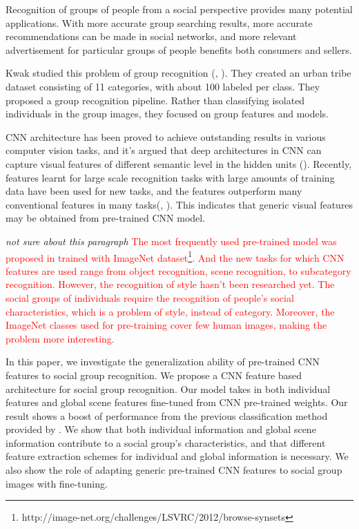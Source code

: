 \documentclass[10pt,twocolumn,letterpaper]{article}
\begin{document}
Recognition of groups of people from a social perspective provides many potential applications.  With more accurate group searching results, more accurate recommendations can be made in social networks, and more relevant advertisement for particular groups of people benefits both consumers and sellers.

Kwak \etal studied this problem of group recognition (\cite{urbantribe}, \cite{urbantribe2}). They created an urban tribe dataset consisting of 11 categories, with about 100 labeled per class.  They proposed a group recognition pipeline. Rather than classifying isolated individuals in the group images, they focused on group features and models.

CNN architecture has been proved to achieve outstanding results in various computer vision tasks, and it's argued that deep architectures in CNN can capture visual features of different semantic level in the hidden units (\cite{ImageNet13}). Recently, features learnt for large scale recognition tasks with large amounts of training data have been used for new tasks, and the features outperform many conventional features in many tasks(\cite{ImageNet13}, \cite{decaf}). This indicates that generic visual features may be obtained from pre-trained CNN model. 

\emph{not sure about this paragraph}
\textcolor{red} {The most frequently used pre-trained model was proposed in \cite{ImageNet} trained with ImageNet dataset\footnote{http://image-net.org/challenges/LSVRC/2012/browse-synsets}. And the new tasks for which CNN features are used range from object recognition, scene recognition, to subcategory recognition. However, the recognition of style hasn't been researched yet. The social groups of individuals require the recognition of people's social characteristics, which is a problem of style, instead of category. Moreover, the ImageNet classes used for pre-training cover few human images, making the problem more interesting.}




In this paper, we investigate the generalization ability of pre-trained CNN features to social group recognition.
We propose a CNN feature based architecture for social group recognition. Our model takes in both individual features and global scene features fine-tuned from CNN pre-trained weights. Our result shows a boost of performance from the previous classification method provided by \cite{urbantribe2}. We show that both individual information and global scene information contribute to a social group's characteristics, and that different feature extraction schemes for individual and global information is necessary. We also show the role of adapting generic pre-trained CNN features to social group images with fine-tuning. 
\end{document}

